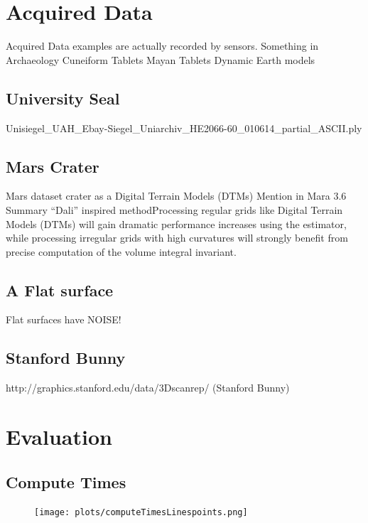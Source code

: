 \documentclass[openany]{book}
\begin{document}
\section{Acquired Data}
Acquired Data examples are actually recorded by sensors.
Something in Archaeology
Cuneiform Tablets
Mayan Tablets
Dynamic Earth models

\subsection{University Seal}
Unisiegel\_UAH\_Ebay-Siegel\_Uniarchiv\_HE2066-60\_010614\_partial\_ASCII.ply

\subsection{Mars Crater}
Mars dataset crater as a Digital Terrain Models (DTMs) Mention in Mara 3.6 
Summary “Dali” inspired methodProcessing regular grids like Digital Terrain 
Models (DTMs) will gain dramatic performance increases using the estimator, 
while processing irregular grids with high curvatures will strongly benefit 
from precise computation of the volume integral invariant.~\cite[p.~143]{Mara12}

\subsection{A Flat surface}
Flat surfaces have NOISE!

\subsection{Stanford Bunny}
http://graphics.stanford.edu/data/3Dscanrep/ (Stanford Bunny)



\section{Evaluation}
\subsection{Compute Times}

\begin{figure}
	\centering
	\texttt{[image: plots/computeTimesLinespoints.png]}
\end{figure}
\end{document}
